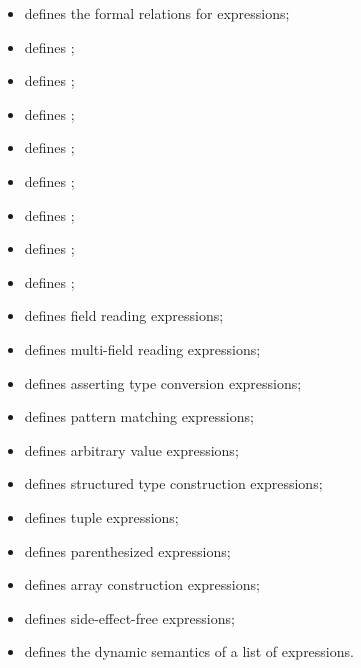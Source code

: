 \ChapterOutline
\begin{itemize}
  \item {} defines the formal relations for expressions;
  \item {} defines \literalexpressionsterm;
  \item {} defines \variableexpressionsterm;
  \item {} defines \binopexpressionsterm;
  \item {} defines \unopexpressionsterm;
  \item {} defines \condexpressionsterm;
  \item {} defines \callexpressionsterm;
  \item {} defines \slicingexpressionsterm;
  \item {} defines \arrayaccessexpressionsterm;
  \item {} defines field reading expressions;
  \item {} defines multi-field reading expressions;
  \item {} defines asserting type conversion expressions;
  \item {} defines pattern matching expressions;
  \item {} defines arbitrary value expressions;
  \item {} defines structured type construction expressions;
  \item {} defines tuple expressions;
  \item {} defines parenthesized expressions;
  \item {} defines array construction expressions;
  \item {} defines side-effect-free expressions;
  \item {} defines the dynamic semantics of a list of expressions.
\end{itemize}

